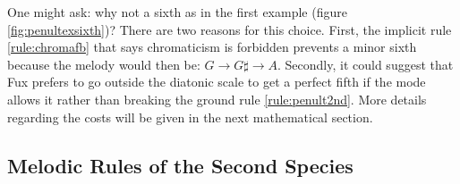 \begin{enumerate}[wide, label=\bfseries 2.H\arabic*]
    One might ask: why not a sixth as in the first example (figure \ref{fig:penultexsixth})? There are two reasons for this choice. First, the implicit rule \ref{rule:chromafb} that says chromaticism is forbidden prevents a minor sixth because the melody would then be: $G \to G\sharp \to A$. Secondly, it could suggest that Fux prefers to go outside the diatonic scale to get a perfect fifth if the mode allows it rather than breaking the ground rule \ref{rule:penult2nd}. More details regarding the costs will be given in the next mathematical section.

\end{enumerate}

\subsection{Melodic Rules of the Second Species}
